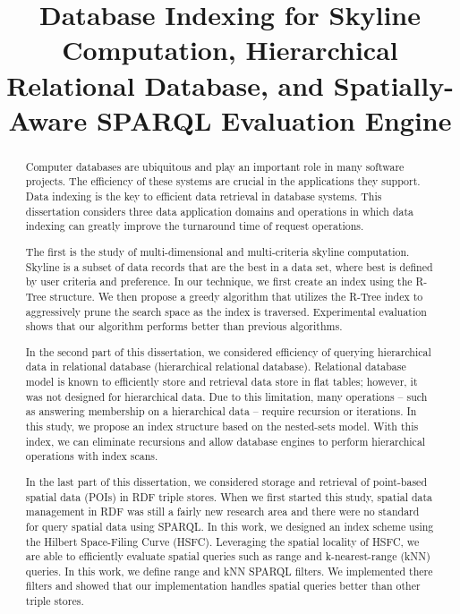 \documentclass[12pt]{report}
\title{Database Indexing for Skyline Computation, Hierarchical Relational Database, and Spatially-Aware SPARQL Evaluation Engine}
\begin{document}
\begin{romanpages}      %

\TitlePage 

\begin{abstract}
Computer databases are ubiquitous and play an important role in many software projects. The efficiency of these systems are crucial in the applications they support. Data indexing is the key to efficient data retrieval in database systems. This dissertation considers three data application domains and operations in which data indexing can greatly improve the turnaround time of request operations.

The first is the study of multi-dimensional and multi-criteria skyline computation. Skyline is a subset of data records that are the best in a data set, where best is defined by user criteria and preference. In our technique, we first create an index using the R-Tree structure. We then propose a greedy algorithm that utilizes the R-Tree index to aggressively prune the search space as the index is traversed. Experimental evaluation shows that our algorithm performs better than previous algorithms.

In the second part of this dissertation, we considered efficiency of querying hierarchical data in relational database (hierarchical relational database). Relational database model is known to efficiently store and retrieval data store in flat tables; however, it was not designed for hierarchical data. Due to this limitation, many operations -- such as answering membership on a hierarchical data -- require recursion or iterations. In this study, we propose an index structure based on the nested-sets model. With this index, we can eliminate recursions and allow database engines to perform hierarchical operations with index scans.

In the last part of this dissertation, we considered storage and retrieval of point-based spatial data (POIs) in RDF triple stores. When we first started this study, spatial data management in RDF was still a fairly new research area and there were no standard for query spatial data using SPARQL. In this work, we designed an index scheme using the Hilbert Space-Filing Curve (HSFC). Leveraging the spatial locality of HSFC, we are able to efficiently evaluate spatial queries such as range and k-nearest-range (kNN) queries. In this work, we define range and kNN SPARQL filters. We implemented there filters and showed that our implementation handles spatial queries better than other triple stores.
\end{abstract}


\end{romanpages}
\end{document}
